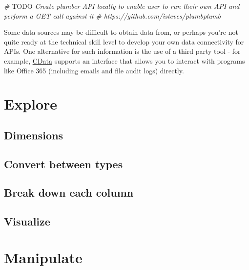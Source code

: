 \documentclass[
]{book}
\newenvironment{Shaded}{\begin{snugshade}}{\end{snugshade}}
\newcommand{\AlertTok}[1]{\textcolor[rgb]{0.94,0.16,0.16}{#1}}
\newcommand{\CommentTok}[1]{\textcolor[rgb]{0.56,0.35,0.01}{\textit{#1}}}
\begin{document}
\begin{Shaded}
\begin{Highlighting}[]
\CommentTok{# }\AlertTok{TODO}\CommentTok{ Create plumber API locally to enable user to run their own API and perform a GET call against it}
\CommentTok{# https://github.com/isteves/plumbplumb}
\end{Highlighting}
\end{Shaded}

Some data sources may be difficult to obtain data from, or perhaps you're not quite ready at the technical skill level to develop your own data connectivity for APIs. One alternative for such information is the use of a third party tool - for example, \href{https://www.cdata.com/kb/tech/office365-jdbc-r.rst}{CData} supports an interface that allows you to interact with programs like Office 365 (including emails and file audit logs) directly.

\hypertarget{explore}{%
\chapter{Explore}\label{explore}}

\hypertarget{dimensions}{%
\section{Dimensions}\label{dimensions}}

\hypertarget{convert-between-types}{%
\section{Convert between types}\label{convert-between-types}}

\hypertarget{break-down-each-column}{%
\section{Break down each column}\label{break-down-each-column}}

\hypertarget{visualize}{%
\section{Visualize}\label{visualize}}

\hypertarget{manipulate}{%
\chapter{Manipulate}\label{manipulate}}
\end{document}
